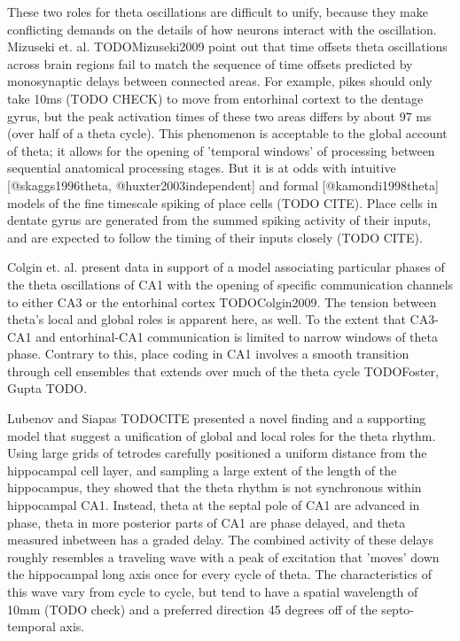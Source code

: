 \documentclass[10pt]{article}
\begin{document}
These two roles for theta oscillations are difficult to unify, because they make conflicting demands on the details of how neurons interact with the oscillation.  Mizuseki et. al. TODO{Mizuseki2009} point out that time offsets theta oscillations across brain regions fail to match the sequence  of time offsets predicted by monosynaptic delays between connected areas.  For example, pikes should only take 10ms (TODO CHECK) to move from entorhinal cortext to the dentage gyrus, but the peak activation times of these two areas differs by about 97 ms (over half of a theta cycle).  This phenomenon is acceptable to the global account of theta; it allows for the opening of 'temporal windows' of processing between sequential anatomical processing stages.  But it is at odds with intuitive [@skaggs1996theta, @huxter2003independent] and formal [@kamondi1998theta] models of the fine timescale spiking of place cells (TODO CITE).  Place cells in dentate gyrus are generated from the summed spiking activity of their inputs, and are expected to follow the timing of their inputs closely (TODO CITE).

Colgin et. al. present data in support of a model associating particular phases of the theta oscillations of CA1 with the opening of specific communication channels to either CA3 or the entorhinal cortex TODO{Colgin2009}.  The tension between theta's local and global roles is apparent here, as well. To the extent that CA3-CA1 and entorhinal-CA1 communication is limited to narrow windows of theta phase. Contrary to this, place coding in CA1 involves a smooth transition through cell ensembles that extends over much of the theta cycle TODO{Foster, Gupta TODO}.

Lubenov and Siapas TODOCITE presented a novel finding and a supporting model that suggest a unification of global and local roles for the theta rhythm. Using large grids of tetrodes carefully positioned a uniform distance from the hippocampal cell layer, and sampling a large extent of the length of the hippocampus, they showed that the theta rhythm is not synchronous within hippocampal CA1. Instead, theta at the septal pole of CA1 are advanced in phase, theta in more posterior parts of CA1 are phase delayed, and theta measured inbetween has a graded delay. The combined activity of these delays roughly resembles a traveling wave with a peak of excitation that 'moves' down the hippocampal long axis once for every cycle of theta. The characteristics of this wave vary from cycle to cycle, but tend to have a spatial wavelength of 10mm (TODO check) and a preferred direction 45 degrees off of the septo-temporal axis.
\end{document}
